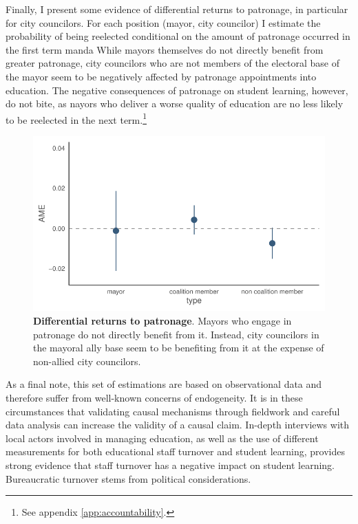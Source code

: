 Finally, I present some evidence of differential returns to patronage, in particular for city councilors. For each position (mayor, city councilor) I estimate the probability of being reelected conditional on the amount of patronage occurred in the first term manda While mayors themselves do not directly benefit from greater patronage, city councilors who are not members of the electoral base of the mayor seem to be negatively affected by patronage appointments into education. The negative consequences of patronage on student learning, however, do not bite, as nayors who deliver a worse quality of education are no less likely to be reelected in the next term.\footnote{See appendix \ref{app:accountability}.}

\begin{figure}[h]
    \centering
    \includegraphics[width=0.6\linewidth]{chapters/chapter_1/plots/reelection_marginal_effect_plots.pdf}
    \caption{\textbf{Differential returns to patronage}. Mayors who engage in patronage do not directly benefit from it. Instead, city councilors in the mayoral ally base seem to be benefiting from it at the expense of non-allied city councilors.}
\end{figure}

As a final note, this set of estimations are based on observational data and therefore suffer from well-known concerns of endogeneity. It is in these circumstances that validating causal mechanisms through fieldwork and careful data analysis can increase the validity of a causal claim. In-depth interviews with local actors involved in managing education, as well as the use of different measurements for both educational staff turnover and student learning, provides strong evidence that staff turnover has a negative impact on student learning. Bureaucratic turnover stems from political considerations.



